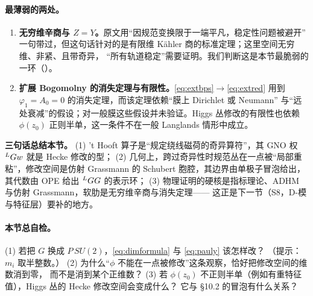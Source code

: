 \paragraph{最薄弱的两处。}\label{par:weakest}
\begin{enumerate}
\item \textbf{无穷维辛商与 $Z=Y$。}原文用“因规范变换限于一端平凡，稳定性问题被避开”
一句带过，但这句话针对的是有限维 Kähler 商的标准定理；这里空间无穷维、非紧、且带奇异，
“所有轨道稳定”需要证明。我们判断这是本节最脆弱的一环（\pC）。
\item \textbf{扩展 Bogomolny 的消失定理与有限性。}\eqref{eq:extbps}$\to$\eqref{eq:extred}
用到 $\varphi_1=A_0=0$ 的消失定理，而该定理依赖“膜上 Dirichlet 或 Neumann”
与“远处衰减”的假设；对一般膜这些假设并未验证。Higgs 丛修改的有限性也依赖
$\phi(z_0)$ 正则半单，这一条件不在一般 Langlands 情形中成立。\pC
\end{enumerate}

\begin{keyidea}
\textbf{三句话总结本节。}
(1) 't Hooft{} 算子是“规定绕线磁荷的奇异算符”，其 GNO 权 ${}^{L}G w$ 就是 Hecke 修改的型；
(2) 几何上，跨过奇异性时规范丛在一点被“局部重粘”，修改空间是仿射 Grassmann 的
Schubert 胞腔，其边界由单极子冒泡给出，其代数由 OPE 给出 ${}^{L}G G$ 的表示环；
(3) 物理证明的硬核是指标理论、ADHM 与仿射 Grassmann，软肋是无穷维辛商与消失定理——
这正是下一节（S8，D-模与特征层）要补的地方。
\end{keyidea}

\paragraph{本节总自检。}
(1) 若把 $G$ 换成 $P\,SU(2)$，\eqref{eq:dimformula} 与 \eqref{eq:pauly} 该怎样改？
（提示：$m_i$ 取半整数。）
(2) 为什么“$\phi$ 不能在一点被修改”这条观察，恰好把修改空间的维数消到零，
而不是消到某个正维数？
(3) 若 $\phi(z_0)$ 不正则半单（例如有重特征值），Higgs 丛的 Hecke 修改空间会变成什么？
它与 §10.2 的冒泡有什么关系？
